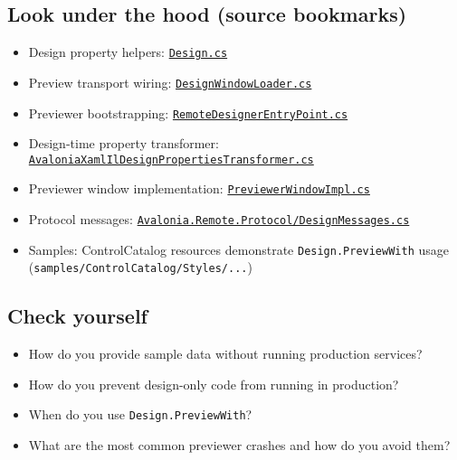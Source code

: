 \subsection{Look under the hood (source
bookmarks)}\label{look-under-the-hood-source-bookmarks-23}

\begin{itemize}
\tightlist
\item
  Design property helpers:
  \href{https://github.com/AvaloniaUI/Avalonia/blob/master/src/Avalonia.Controls/Design.cs}{\passthrough{\lstinline!Design.cs!}}
\item
  Preview transport wiring:
  \href{https://github.com/AvaloniaUI/Avalonia/blob/master/src/Avalonia.DesignerSupport/DesignWindowLoader.cs}{\passthrough{\lstinline!DesignWindowLoader.cs!}}
\item
  Previewer bootstrapping:
  \href{https://github.com/AvaloniaUI/Avalonia/blob/master/src/Avalonia.DesignerSupport/Remote/RemoteDesignerEntryPoint.cs}{\passthrough{\lstinline!RemoteDesignerEntryPoint.cs!}}
\item
  Design-time property transformer:
  \href{https://github.com/AvaloniaUI/Avalonia/blob/master/src/Markup/Avalonia.Markup.Xaml.Loader/CompilerExtensions/Transformers/AvaloniaXamlIlDesignPropertiesTransformer.cs}{\passthrough{\lstinline!AvaloniaXamlIlDesignPropertiesTransformer.cs!}}
\item
  Previewer window implementation:
  \href{https://github.com/AvaloniaUI/Avalonia/blob/master/src/Avalonia.DesignerSupport/Remote/PreviewerWindowImpl.cs}{\passthrough{\lstinline!PreviewerWindowImpl.cs!}}
\item
  Protocol messages:
  \href{https://github.com/AvaloniaUI/Avalonia/blob/master/src/Avalonia.Remote.Protocol/DesignMessages.cs}{\passthrough{\lstinline!Avalonia.Remote.Protocol/DesignMessages.cs!}}
\item
  Samples: ControlCatalog resources demonstrate
  \passthrough{\lstinline!Design.PreviewWith!} usage
  (\passthrough{\lstinline!samples/ControlCatalog/Styles/...!})
\end{itemize}

\subsection{Check yourself}\label{check-yourself-23}

\begin{itemize}
\tightlist
\item
  How do you provide sample data without running production services?
\item
  How do you prevent design-only code from running in production?
\item
  When do you use \passthrough{\lstinline!Design.PreviewWith!}?
\item
  What are the most common previewer crashes and how do you avoid them?
\end{itemize}

